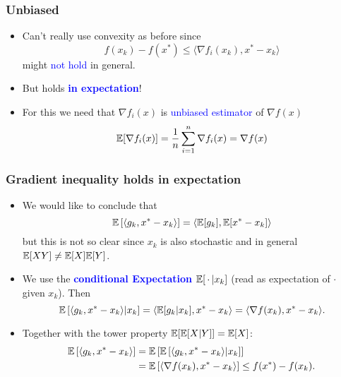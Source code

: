 \documentclass{beamer}
\begin{document}
\begin{frame}
  \frametitle{Unbiased}
  \begin{itemize}
    \item Can't really use convexity as before since
          \begin{equation}
            f(x_k)-f(x^*) \le \langle \nabla f_i(x_k), x^*-x_k \rangle
          \end{equation}
          might \textcolor{blue}{not hold} in general.
    \item But holds \textcolor{blue}{\textbf{in expectation}}!
    \item For this we need that $\nabla f_i(x)$ is \textcolor{blue}{unbiased estimator} of $\nabla f(x)$
  \begin{equation}
    \mathbb{E} [\nabla f_i(x)] = \frac{1}{n} \sum_{i=1}^{n} \nabla f_i(x) = \nabla f(x)
  \end{equation}
  \end{itemize}

\end{frame}


\begin{frame}
  \frametitle{Gradient inequality holds in expectation}

  \begin{itemize}
    \item We would like to conclude that
          \begin{equation}
            \mathbb{E} \left[ \langle g_k, x^*-x_k \rangle\right] = \langle \mathbb{E}[g_k], \mathbb{E}[x^*-x_k] \rangle
          \end{equation}
          but this is not so clear since $x_k$ is also stochastic and in general $\mathbb{E}[XY]\neq \mathbb{E}[X]\mathbb{E}[Y]$.

    \item We use the \textcolor{blue}{\textbf{conditional Expectation}} $\mathbb{E}[\, \cdot \, | x_k]$ (read as expectation of $\cdot$ given $x_k$). Then
          \begin{equation}
            \mathbb{E} \left[ \langle g_k, x^*-x_k \rangle | x_k \right] = \langle \mathbb{E}[g_k | x_k], x^*-x_k \rangle = \langle \nabla f(x_k), x^*-x_k \rangle.
          \end{equation}
    \item Together with the tower property $\mathbb{E}[\mathbb{E}[X|Y]]= \mathbb{E}[X]$:
          \begin{align}
            \mathbb{E} \left[ \langle g_k, x^*-x_k \rangle \right] &= \mathbb{E}\left[\mathbb{E} \left[ \langle g_k, x^*-x_k \rangle | x_k \right] \right] \\
                                               &= \mathbb{E}\left[\langle \nabla f(x_k), x^*-x_k \rangle \right] \le f(x^*) - f(x_k).
          \end{align}

  \end{itemize}

\end{frame}
\end{document}
